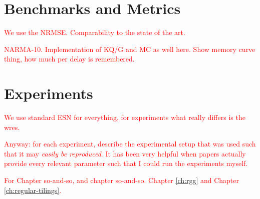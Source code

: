 \section{Benchmarks and Metrics}

\textcolor{red}{
  We use the NRMSE. Comparability to the state of the art.
}

\textcolor{red}{
  NARMA-10. Implementation of KQ/G and MC as well here. Show memory curve thing,
how much per delay is remembered.
}


\section{Experiments}

\textcolor{red}{
  We use standard ESN for everything, for experiments what really differs is the
wres.
}

\textcolor{red}{
  Anyway: for each experiment, describe the experimental setup that was used
such that it may \textit{easily be reproduced}. It has been very helpful when
papers actually provide every relevant parameter such that I could run the
experiments myself.
}

\textcolor{red}{
  For Chapter so-and-so, and chapter so-and-so. Chapter \ref{ch:rgg} and Chapter
\ref{ch:regular-tilings}.
}



